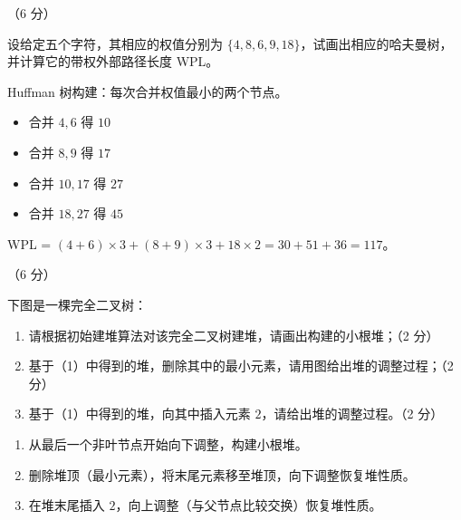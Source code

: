 \begin{question}[Huffman树]（6 分）

设给定五个字符，其相应的权值分别为 $\{4,8,6,9,18\}$，试画出相应的哈夫曼树，并计算它的带权外部路径长度 WPL。

\begin{solution}
Huffman 树构建：每次合并权值最小的两个节点。
\begin{itemize}
  \item 合并 $4,6$ 得 $10$
  \item 合并 $8,9$ 得 $17$
  \item 合并 $10,17$ 得 $27$
  \item 合并 $18,27$ 得 $45$
\end{itemize}
WPL = $(4+6)\times3 + (8+9)\times3 + 18\times2 = 30+51+36=117$。
\end{solution}
\end{question}

\begin{question}[堆操作]（6 分）

下图是一棵完全二叉树：

\begin{enumerate}[label=\arabic*)]
  \item 请根据初始建堆算法对该完全二叉树建堆，请画出构建的小根堆；（2 分）
  \item 基于（1）中得到的堆，删除其中的最小元素，请用图给出堆的调整过程；（2 分）
  \item 基于（1）中得到的堆，向其中插入元素 $2$，请给出堆的调整过程。（2 分）
\end{enumerate}

\begin{solution}
\begin{enumerate}[label=\arabic*)]
  \item 从最后一个非叶节点开始向下调整，构建小根堆。
  \item 删除堆顶（最小元素），将末尾元素移至堆顶，向下调整恢复堆性质。
  \item 在堆末尾插入 $2$，向上调整（与父节点比较交换）恢复堆性质。
\end{enumerate}
\end{solution}
\end{question}

